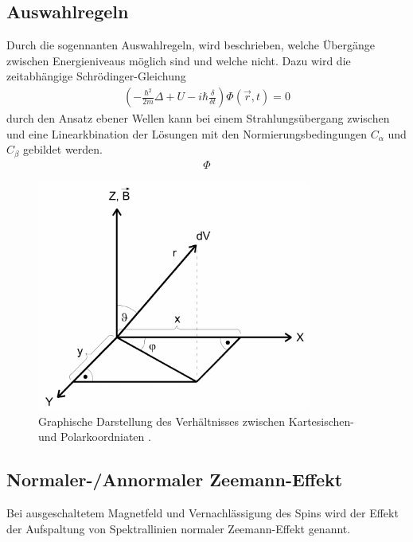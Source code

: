 \subsection{Auswahlregeln}
\label{sec:Auswahlregeln}
Durch die sogennanten Auswahlregeln, wird beschrieben, welche Übergänge zwischen
Energieniveaus möglich sind und welche nicht. Dazu wird die zeitabhängige
Schrödinger-Gleichung
\begin{align}
  \left( -\frac{\hbar^2}{2m}\Delta+U-i\hbar \frac{\delta}{\delta t} \right)\Phi\left(\vec{r}, t \right) = 0
  \label{eqn:schroedinger}
\end{align}
durch den Ansatz ebener Wellen kann bei einem Strahlungsübergang zwischen \alpha
und \beta eine Linearkbination der Lösungen mit den Normierungsbedingungen $C_\alpha$
und $C_\beta$ gebildet werden.
\begin{align}
  \Phi
  \label{eqn:ebenewelle}
\end{align}
\begin{figure}[htb]
  \centering
  \includegraphics[width=0.8\textwidth]{images/V27_2.pdf}
  \caption{Graphische Darstellung des Verhältnisses zwischen Kartesischen- und Polarkoordniaten \cite{anleitung}.}
  \label{abb:polar}
\end{figure}

\subsection{Normaler-/Annormaler Zeemann-Effekt}
\label{sec:Zeemann}
Bei ausgeschaltetem Magnetfeld und Vernachlässigung des Spins wird der Effekt der
Aufspaltung von Spektrallinien normaler Zeemann-Effekt genannt.


